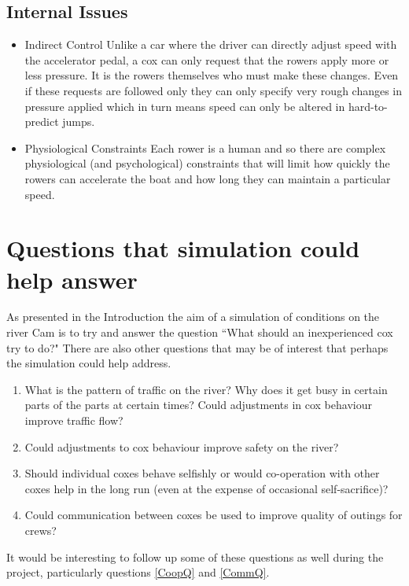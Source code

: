 \subsection{Internal Issues}
\begin{itemize}
  \item{Indirect Control} Unlike a car where the driver can directly adjust speed with the accelerator pedal, a cox can only request that the rowers apply more or less pressure. It is the rowers themselves who must make these changes. Even if these requests are followed only they can only specify very rough changes in pressure applied which in turn means speed can only be altered in hard-to-predict jumps.
  
  \item{Physiological Constraints} Each rower is a human and so there are complex physiological (and psychological) constraints that will limit how quickly the rowers can accelerate the boat and how long they can maintain a particular speed.
\end{itemize}


\section{Questions that simulation could help answer}

As presented in the Introduction the aim of a simulation of conditions on the river Cam is to try and answer the question ``What should an inexperienced cox try to do?" There are also other questions that may be of interest that perhaps the simulation could help address.

\begin{enumerate}
  \item What is the pattern of traffic on the river? Why does it get busy in certain parts of the parts at certain times? Could adjustments in cox behaviour improve traffic flow?
  \item Could adjustments to cox behaviour improve safety on the river?
  \item \label{CoopQ} Should individual coxes behave selfishly or would co-operation with other coxes help in the long run (even at the expense of occasional self-sacrifice)?
  \item \label{CommQ} Could communication between coxes be used to improve quality of outings for crews?
\end{enumerate}

It would be interesting to follow up some of these questions as well during the project, particularly questions \ref{CoopQ} and \ref{CommQ}.

